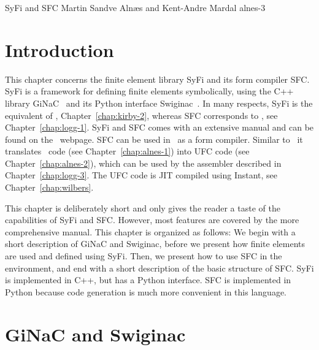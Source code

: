               {SyFi and SFC}
              {Martin Sandve Aln\ae{}s and Kent-Andre Mardal}
              {alnes-3}

\renewcommand{\AA}{A}
\newcommand{\LL}{L}
\newcommand{\JJ}{J}

\section{Introduction}

This chapter concerns the finite element library SyFi and its form
compiler SFC.  SyFi is a framework for defining finite elements
symbolically, using the C++ library GiNaC~\citep{BauerFrinkKreckel2000}
and its Python interface Swiginac~\citep{SkavhaugCertik2009}.  In many
respects, SyFi is the equivalent of \fiat, Chapter~\ref{chap:kirby-2},
whereas SFC corresponds to \ffc, see Chapter~\ref{chap:logg-1}. SyFi
and SFC comes with an extensive manual \citep{AlnaesMardal2009a}
and can be found on the \fenics\ webpage.  SFC can be used in
\fenics\ as a form compiler. Similar to \ffc\ it translates
\ufl\ code (see Chapter~\ref{chap:alnes-1}) into UFC code (see
Chapter~\ref{chap:alnes-2}), which can be used by the \dolfin assembler
described in Chapter~\ref{chap:logg-3}. The UFC code is JIT compiled
using Instant, see Chapter~\ref{chap:wilbers}.

This chapter is deliberately short and only gives the reader a taste of
the capabilities of SyFi and SFC.  However, most features are covered by
the more comprehensive manual.  This chapter is organized as follows:
We begin with a short description of GiNaC and Swiginac, before we
present how finite elements are used and defined using SyFi.  Then, we
present how to use SFC in the \dolfin environment, and end with a short
description of the basic structure of SFC. SyFi is implemented in C++,
but has a Python interface. SFC is implemented in Python because code
generation is much more convenient in this language.

\section{GiNaC and Swiginac}

